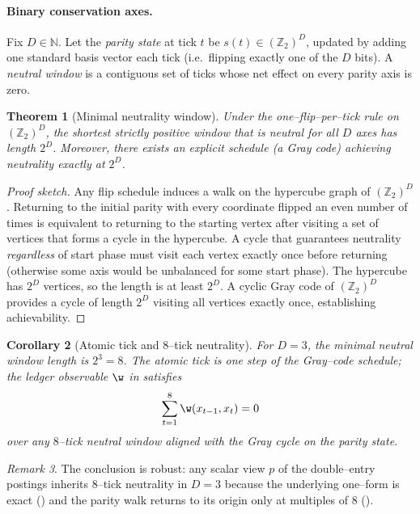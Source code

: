 \documentclass[12pt,a4paper]{article}
\newtheorem{theorem}{Theorem}[section]
\newtheorem{corollary}[theorem]{Corollary}
\theoremstyle{definition}
\theoremstyle{remark}
\newtheorem{remark}[theorem]{Remark}
\begin{document}
\paragraph{Binary conservation axes.}
Fix $D\in\mathbb{N}$. Let the \emph{parity state} at tick $t$ be $s(t)\in(\mathbb{Z}_2)^D$, updated by adding one standard basis vector each tick (i.e.\ flipping exactly one of the $D$ bits). A \emph{neutral window} is a contiguous set of ticks whose net effect on every parity axis is zero.

\begin{theorem}[Minimal neutrality window]
\label{thm:min-period}
Under the one--flip--per--tick rule on $(\mathbb{Z}_2)^D$, the shortest strictly positive window that is neutral for \emph{all} $D$ axes has length $2^D$. Moreover, there exists an explicit schedule (a Gray code) achieving neutrality exactly at $2^D$.
\end{theorem}

\begin{proof}[Proof sketch]
Any flip schedule induces a walk on the hypercube graph of $(\mathbb{Z}_2)^D$. Returning to the initial parity with every coordinate flipped an even number of times is equivalent to returning to the starting vertex after visiting a set of vertices that forms a cycle in the hypercube. A cycle that guarantees neutrality \emph{regardless} of start phase must visit each vertex exactly once before returning (otherwise some axis would be unbalanced for some start phase). The hypercube has $2^D$ vertices, so the length is at least $2^D$. A cyclic Gray code of $(\mathbb{Z}_2)^D$ provides a cycle of length $2^D$ visiting all vertices exactly once, establishing achievability.
\end{proof}

\begin{corollary}[Atomic tick and $8$--tick neutrality]
\label{cor:8tick}
For $D=3$, the minimal neutral window length is $2^3=8$. The \emph{atomic tick} is one step of the Gray--code schedule; the ledger observable $\w$ in  satisfies
\[
  \sum_{t=1}^{8}\w(x_{t-1},x_{t})=0
\]
over any $8$--tick neutral window aligned with the Gray cycle on the parity state.
\end{corollary}

\begin{remark}
The conclusion is robust: any scalar view $p$ of the double--entry postings inherits $8$--tick neutrality in $D=3$ because the underlying one--form is exact () and the parity walk returns to its origin only at multiples of $8$ ().
\end{remark}
\end{document}
